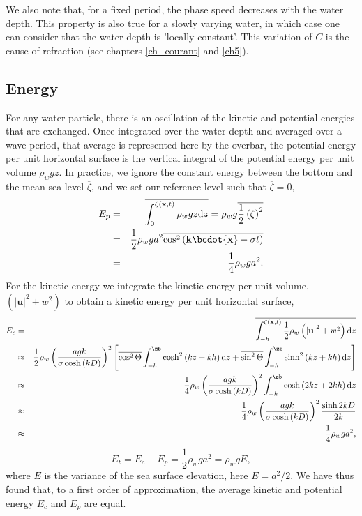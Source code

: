 We also note that, for a fixed period, the phase speed decreases 
with the water depth. This property is also true for a slowly varying water, 
in which case one can consider that the water depth is 'locally constant'. 
This variation of $C$ is the cause of refraction (see chapters \ref{ch_courant} and \ref{ch5}). 


\subsection{Energy}
For any water particle, there is an oscillation of the kinetic and potential energies that are exchanged. 
Once integrated over the water depth and averaged over a wave period, that average is represented here by 
the overbar, the potential energy per unit horizontal surface is the vertical integral 
of the potential energy per unit volume $ \rho_w g z$. In practice, we ignore the constant energy between the 
bottom and the mean sea level $\overline{\zeta}$, and we set our reference level such that $\overline{\zeta}=0$,
\begin{eqnarray}
    E_p & = & \overline{ \int_{0}^{\zeta\left(\mathbf{x},t\right)} \rho_w g z {\mathrm d}z }
          = \rho_w g  \overline{ \frac{1}{2} \left(\zeta\right)^2 }   \nonumber\\
    & = & \frac{1}{2} \rho_w g a^2 \overline{ \cos^2\left({\mathbf k} \bcdot {\mathbf x}
    - \sigma t \right) } \nonumber\\
    & = & \frac{1}{4} \rho_w g a^2.
\end{eqnarray}
For the kinetic energy we integrate the kinetic energy per unit volume, $\left( \left|{\mathbf u}\right|^2 + w^2 \right)$ to obtain 
a kinetic energy per unit horizontal surface, 
\begin{eqnarray}
    E_c & = & \overline{  \int_{-h}^{\zeta\left(\mathbf{x},t\right)} \frac{1}{2} \rho_w
\left( \left|{\mathbf u}\right|^2 + w^2 \right) {\mathrm d}z } \nonumber\\
    & \approx & \frac{1}{2} \rho_w \left( \frac{a g k}{\sigma \cosh \left( kD \right)}
    \right)^2 \left[  \overline{ \cos^2 \Theta } \int_{-h}^{\zb} \cosh^2\left(kz+kh\right) {\mathrm d}z 
                   + \overline{ \sin^2 \Theta } \int_{-h}^{\zb} \sinh^2\left(kz+kh\right) {\mathrm d}z     \right] \nonumber\\
    & \approx & \frac{1}{4} \rho_w \left( \frac{a g k}{\sigma \cosh \left( kD \right)}
    \right)^2 \int_{-h}^{\zb} \cosh\left(2kz+2kh\right) {\mathrm d}z \nonumber \\
    & \approx & \frac{1}{4} \rho_w \left( \frac{a g k}{\sigma \cosh \left( kD \right)}
    \right)^2 \frac{\sinh 2kD}{2k}  \nonumber \\
    & \approx & \frac{1}{4} \rho_w g a^2,
\end{eqnarray}
\begin{equation}
    E_t= E_c+E_p= \frac{1}{2} \rho_w g a^2 = \rho_w g  E  ,\label{Etot}
\end{equation}
where $E$ is the variance of the sea surface elevation, here $E=a^2 /2$. 
We have thus found that, to a first order of approximation, the average kinetic and potential energy 
 $E_c$ and $E_p$ are equal. 

